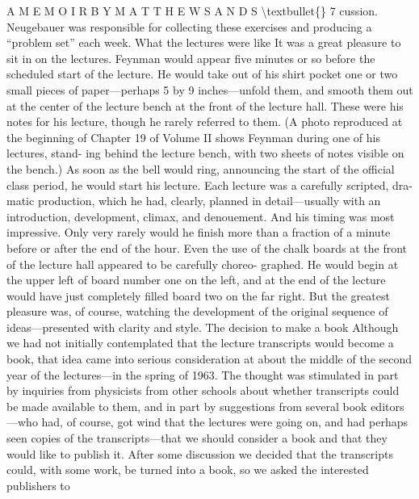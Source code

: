 \documentclass[10pt,oneside]{article}
\begin{document}
A  M E M O I R  B Y  M A T T H E W  S A N D S \textbackslash{}textbullet\{\} 7 cussion. Neugebauer was responsible for collecting these exercises and producing a “problem set” each week. What the lectures were like It was a great pleasure to sit in on the lectures. Feynman would appear five minutes or so before the scheduled start of the lecture. He would take out of his shirt pocket one or two small pieces of paper---perhaps 5 by 9 inches---unfold them, and smooth them out at the center of the lecture bench at the front of the lecture hall. These were his notes for his lecture, though he rarely referred to them. (A photo reproduced at the beginning of Chapter 19 of Volume II shows Feynman during one of his lectures, stand- ing behind the lecture bench, with two sheets of notes visible on the bench.) As soon as the bell would ring, announcing the start of the official class period, he would start his lecture. Each lecture was a carefully scripted, dra- matic production, which he had, clearly, planned in detail---usually with an introduction, development, climax, and denouement. And his timing was most impressive. Only very rarely would he finish more than a fraction of a minute before or after the end of the hour. Even the use of the chalk boards at the front of the lecture hall appeared to be carefully choreo- graphed. He would begin at the upper left of board number one on the left, and at the end of the lecture would have just completely filled board two on the far right. But the greatest pleasure was, of course, watching the development of the original sequence of ideas---presented with clarity and style. The decision to make a book Although we had not initially contemplated that the lecture transcripts would become a book, that idea came into serious consideration at about the middle of the second year of the lectures---in the spring of 1963. The thought was stimulated in part by inquiries from physicists from other schools about whether transcripts could be made available to them, and in part by suggestions from several book editors---who had, of course, got wind that the lectures were going on, and had perhaps seen copies of the transcripts---that we should consider a book and that they would like to publish it. After some discussion we decided that the transcripts could, with some work, be turned into a book, so we asked the interested publishers to\par
\end{document}
